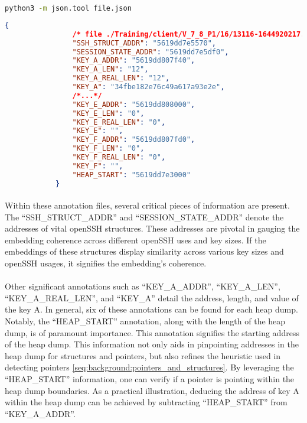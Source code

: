             \begin{lstlisting}[caption={pretty print JSON}, label=methods:code:pretty_print_json, language=bash]
                python3 -m json.tool file.json
            \end{lstlisting}
            \begin{lstlisting}[language=json, caption={An extract of the JSON annotations}, label=methods:code:annotation_extract]
            {
                /* file ./Training/client/V_7_8_P1/16/13116-1644920217.json*/
                "SSH_STRUCT_ADDR": "5619dd7e5570",
                "SESSION_STATE_ADDR": "5619dd7e5df0",
                "KEY_A_ADDR": "5619dd807f40",
                "KEY_A_LEN": "12",
                "KEY_A_REAL_LEN": "12",
                "KEY_A": "34fbe182e76c49a617a93e2e",
                /*...*/
                "KEY_E_ADDR": "5619dd808000",
                "KEY_E_LEN": "0",
                "KEY_E_REAL_LEN": "0",
                "KEY_E": "",
                "KEY_F_ADDR": "5619dd807fd0",
                "KEY_F_LEN": "0",
                "KEY_F_REAL_LEN": "0",
                "KEY_F": "",
                "HEAP_START": "5619dd7e3000"
            }
            \end{lstlisting}

            \paragraph{}Within these annotation files, several critical pieces of information are present. The ``SSH\_STRUCT\_ADDR'' and ``SESSION\_STATE\_ADDR'' denote the addresses of vital openSSH \glspl{structure}. These addresses are pivotal in gauging the embedding coherence across different openSSH uses and key sizes. If the embeddings of these \glspl{structure} display similarity across various key sizes and openSSH usages, it signifies the embedding's coherence.

            \paragraph{}Other significant annotations such as ``KEY\_A\_ADDR'', ``KEY\_A\_LEN'', ``KEY\_A\_REAL\_LEN'', and ``KEY\_A'' detail the address, length, and value of the key A. In general, six of these annotations can be found for each heap dump. Notably, the ``HEAP\_START'' annotation, along with the length of the heap dump, is of paramount importance. This annotation signifies the starting address of the heap dump. This information not only aids in pinpointing addresses in the heap dump for \glspl{structure} and \glspl{pointer}, but also refines the heuristic used in detecting \glspl{pointer} \ref{seq:background:pointers_and_structures}. By leveraging the ``HEAP\_START'' information, one can verify if a \gls{pointer} is pointing within the heap dump boundaries. As a practical illustration, deducing the address of key A within the heap dump can be achieved by subtracting ``HEAP\_START'' from ``KEY\_A\_ADDR''.

